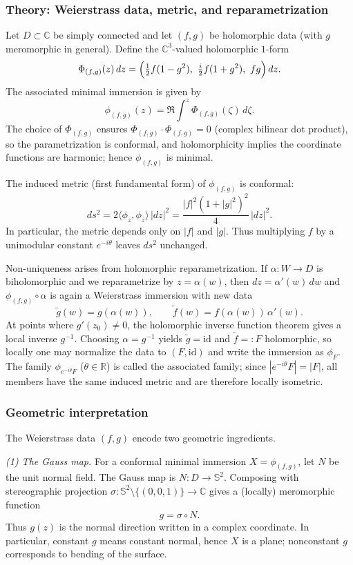 \documentclass[12pt,a4paper]{article}
\theoremstyle{plain}
\theoremstyle{definition}      %
\begin{document}
\medskip

\subsubsection*{Theory: Weierstrass data, metric, and reparametrization}
Let $D\subset\mathbb C$ be simply connected and let $(f,g)$ be holomorphic data (with $g$ meromorphic in general).
Define the $\mathbb C^3$-valued holomorphic $1$-form
\[
\Phi_{(f,g)}(z)\,dz
=
\Bigl(\tfrac12 f(1-g^2),\ \tfrac{i}{2}f(1+g^2),\ fg\Bigr)\,dz.
\]
The associated minimal immersion is given by
\[
\phi_{(f,g)}(z)=\Re\int^z \Phi_{(f,g)}(\zeta)\,d\zeta.
\]
The choice of $\Phi_{(f,g)}$ ensures $\Phi_{(f,g)}\cdot\Phi_{(f,g)}=0$ (complex bilinear dot product), so the parametrization is
conformal, and holomorphicity implies the coordinate functions are harmonic; hence $\phi_{(f,g)}$ is minimal.

\smallskip
The induced metric (first fundamental form) of $\phi_{(f,g)}$ is conformal:
\[
ds^2
=
2\langle \phi_z,\phi_{\bar z}\rangle\,|dz|^2
=
\frac{|f|^2(1+|g|^2)^2}{4}\,|dz|^2.
\]
In particular, the metric depends only on $|f|$ and $|g|$. Thus multiplying $f$ by a unimodular constant
$e^{-i\theta}$ leaves $ds^2$ unchanged.

\smallskip
Non-uniqueness arises from holomorphic reparametrization.
If $\alpha:W\to D$ is biholomorphic and we reparametrize by $z=\alpha(w)$, then $dz=\alpha'(w)\,dw$ and
$\phi_{(f,g)}\circ\alpha$ is again a Weierstrass immersion with new data
\[
\tilde g(w)=g(\alpha(w)),
\qquad
\tilde f(w)=f(\alpha(w))\,\alpha'(w).
\]
At points where $g'(z_0)\neq 0$, the holomorphic inverse function theorem gives a local inverse $g^{-1}$.
Choosing $\alpha=g^{-1}$ yields $\tilde g=\mathrm{id}$ and $\tilde f=:F$ holomorphic, so locally one may normalize the data to
$(F,\mathrm{id})$ and write the immersion as $\phi_F$.
The family $\phi_{e^{-i\theta}F}$ ($\theta\in\mathbb R$) is called the associated family; since $|e^{-i\theta}F|=|F|$, all
members have the same induced metric and are therefore locally isometric.

\medskip

\subsubsection*{Geometric interpretation}
The Weierstrass data $(f,g)$ encode two geometric ingredients.

\smallskip
\emph{(1) The Gauss map.}
For a conformal minimal immersion $X=\phi_{(f,g)}$, let $N$ be the unit normal field.
The Gauss map is $N:D\to\mathbb S^2$. Composing with stereographic projection
$\sigma:\mathbb S^2\setminus\{(0,0,1)\}\to\mathbb C$ gives a (locally) meromorphic function
\[
g=\sigma\circ N.
\]
Thus $g(z)$ is the normal direction written in a complex coordinate. In particular, constant $g$ means constant normal,
hence $X$ is a plane; nonconstant $g$ corresponds to bending of the surface.
\end{document}
